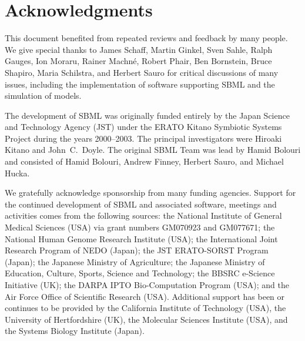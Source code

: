 
\section{Acknowledgments}
\label{sec:acknowledgements}
\label{sec:acknowledgments}

\begin{blockChanged}

This document benefited from repeated reviews and feedback by many
people.  We give special thanks to James Schaff, Martin Ginkel,
Sven Sahle, Ralph Gauges, Ion Moraru, Rainer Machn\'{e}, Robert
Phair, Ben Bornstein, Bruce Shapiro, Maria Schilstra, and Herbert
Sauro for critical discussions of many issues, including the
implementation of software supporting SBML and the
simulation of models.

\end{blockChanged}

The development of SBML was originally funded entirely by the
Japan Science and Technology Agency (JST) under the ERATO Kitano
Symbiotic Systems Project during the years 2000--2003.  The
principal investigators were Hiroaki Kitano and John~C.\ Doyle.
The original SBML Team was lead by Hamid Bolouri and consisted of
Hamid Bolouri, Andrew Finney, Herbert Sauro, and Michael Hucka.

We gratefully acknowledge sponsorship from many funding agencies.
Support for the continued development of SBML and associated
software, meetings and activities comes from the following
sources: the National Institute of General Medical Sciences (USA)
via grant numbers GM070923 and GM077671; the National Human Genome
Research Institute (USA); the International Joint Research Program
of NEDO (Japan); the JST ERATO-SORST Program (Japan); the Japanese
Ministry of Agriculture; the Japanese Ministry of Education,
Culture, Sports, Science and Technology; the BBSRC e-Science
Initiative (UK); the DARPA IPTO Bio-Computation Program (USA); and
the Air Force Office of Scientific Research (USA).  Additional
support has been or continues to be provided by the California
Institute of Technology (USA), the University of Hertfordshire
(UK), the Molecular Sciences Institute (USA), and the Systems
Biology Institute (Japan).

